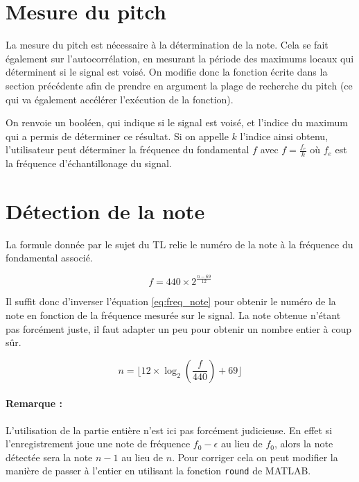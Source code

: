 \documentclass[french]{article}
\begin{document}
\section{Mesure du pitch}

La mesure du pitch est nécessaire à la détermination de la note. Cela se fait également sur l'autocorrélation, en mesurant la période des maximums locaux qui déterminent si le signal est voisé. On modifie donc la fonction écrite dans la section précédente afin de prendre en argument la plage de recherche du pitch (ce qui va également accélérer l'exécution de la fonction). 

On renvoie un booléen, qui indique si le signal est voisé, et l'indice du maximum qui a permis de déterminer ce résultat. Si on appelle $k$ l'indice ainsi obtenu, l'utilisateur peut déterminer la fréquence du fondamental $f$ avec $f = \frac{f_e}{k}$ où $f_e$ est la fréquence d'échantillonage du signal.

\section{Détection de la note}

La formule donnée par le sujet du TL relie le numéro de la note à la fréquence du fondamental associé.

\begin{equation}
f = 440 \times 2 ^{\frac{n - 69}{12}}
\label{eq:freq_note}
\end{equation}

Il suffit donc d'inverser l'équation \ref{eq:freq_note} pour obtenir le numéro de la note en fonction de la fréquence mesurée sur le signal. La note obtenue n'étant pas forcément juste, il faut adapter un peu pour obtenir un nombre entier à coup sûr.

\begin{equation}
n = \lfloor 12 \times \log_2\left(\frac{f}{440}\right) + 69 \rfloor
\end{equation}

\paragraph{Remarque :} L'utilisation de la partie entière n'est ici pas forcément judicieuse. En effet si l'enregistrement joue une note de fréquence $f_0 - \epsilon$ au lieu de $f_0$, alors la note détectée sera la note $n-1$ au lieu de $n$. Pour corriger cela on peut modifier la manière de passer à l'entier en utilisant la fonction \texttt{round} de MATLAB.
\end{document}
